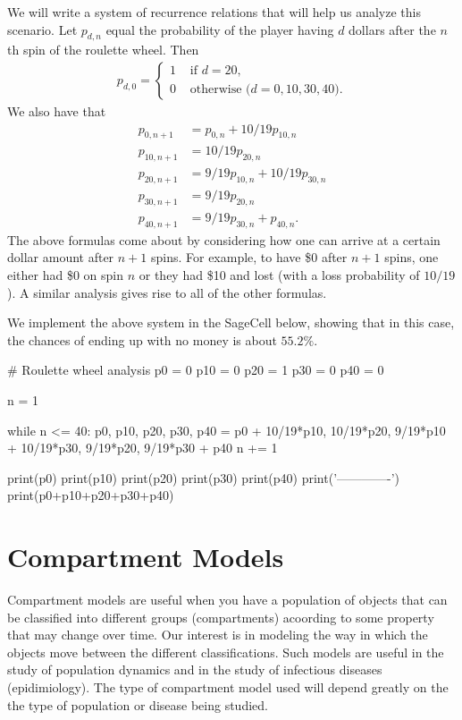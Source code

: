 \documentclass{ximera}
\begin{document}
We will write a system of recurrence relations that will help us
analyze this scenario. Let $p_{d,n}$ equal the probability of the 
player having $d$ dollars after the $n$th spin of the roulette wheel.
Then
\begin{align}
	p_{d,0} = \begin{cases} 1 & \text{ if $d=20$,}\\
                                0 & \text{ otherwise ($d=0,10,30,40$).}
		  \end{cases}
\end{align}
We also have that
\begin{align}
	p_{0,n+1}  &= p_{0,n} + 10/19p_{10,n}\\
	p_{10,n+1} &= 10/19p_{20,n}\\
	p_{20,n+1} &= 9/19p_{10,n} + 10/19p_{30,n}\\
	p_{30,n+1} &= 9/19p_{20,n}\\
	p_{40,n+1} &= 9/19p_{30,n} + p_{40,n}.
\end{align}
The above formulas come about by considering how one can arrive at a certain
dollar amount after $n+1$ spins. For example, to have \$0 after $n+1$ 
spins, one either had \$0 on spin $n$ or they had \$10 and lost (with a
loss probability of $10/19$). A similar analysis gives rise to all of
the other formulas.

We implement the above system in the SageCell below, showing that in this
case, the chances of ending up with no money is about $55.2\%$.

\begin{sageCell}
# Roulette wheel analysis
p0 = 0
p10 = 0
p20 = 1
p30 = 0
p40 = 0

n = 1

while n <= 40:
    p0, p10, p20, p30, p40 = p0 + 10/19*p10, 10/19*p20, 9/19*p10 + 10/19*p30, 9/19*p20, 9/19*p30 + p40
    n += 1

print(p0)
print(p10)
print(p20)
print(p30)
print(p40)
print('-------------')
print(p0+p10+p20+p30+p40)
\end{sageCell}

\section{Compartment Models}

Compartment models are useful when you have a population of objects that
can be classified into different groups (compartments) acoording to some
property that may change over time. Our interest is in modeling the way
in which the objects move between the different classifications. Such models
are useful in the study of population dynamics and in the study of 
infectious diseases (epidimiology). The type of compartment model used will
depend greatly on the the type of population or disease being studied.
\end{document}
